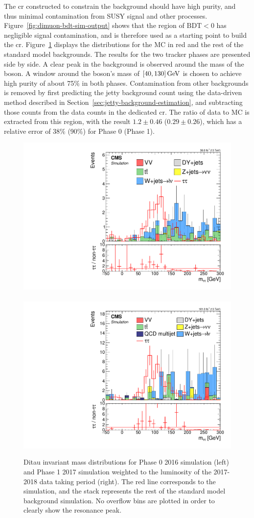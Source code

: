 The \gls{cr} constructed to constrain the \ztautau background should have high purity, and thus minimal contamination from SUSY signal and other processes. Figure~\ref{fig:dimuon-bdt-sim-output} shows that the region of $\text{BDT} < 0$ has negligible signal contamination, and is therefore used as a starting point to build the \tautau \gls{cr}. Figure~\ref{fig:mtautau-distributions} displays the \mtautau distributions for the \tautau MC in red and the rest of the standard model backgrounds. The results for the two tracker phases are presented side by side. A clear peak in the \tautau background is observed around the mass of the \PZ boson. A window around the \PZ boson's mass of $[40,130]\,\text{Ge\hspace{-.08em}V}$ is chosen to achieve high purity of about 75\% in both phases. Contamination from other backgrounds is removed by first predicting the jetty background count using the data-driven method described in Section~\ref{sec:jetty-background-estimation}, and subtracting those counts from the data counts in the \tautau dedicated \gls{cr}. The ratio of data to MC is extracted from this region, with the result $1.2\pm 0.46$ ($0.29\pm 0.26$), which has a relative error of 38\% (90\%) for Phase 0 (Phase 1).

\begin{figure}[!htb]
\centering
\includegraphics[width=0.48\linewidth]{plots/dilepton_muons_bg_isocr_scan_tautau_vs_no_tautau/bdt2_nmtautauCorrJetNoMultIso10Dr0.6.pdf} \,
\includegraphics[width=0.48\linewidth]{plots/dilepton_muons_bg_isocr_scan_tautau_vs_no_tautau_phase1/bdt_nmtautauCorrJetNoMultIso10Dr0.6.pdf} \\


\caption[Ditau invariant mass distibutions]{Ditau invariant mass \mtautau distributions for Phase 0 2016 simulation (left) and Phase 1 2017 simulation weighted to the luminosity of the 2017-2018 data taking period (right). The red line corresponds to the \tautau simulation, and the stack represents the rest of the standard model background simulation. No overflow bins are plotted in order to clearly show the resonance peak.}
\label{fig:mtautau-distributions}
\end{figure}

